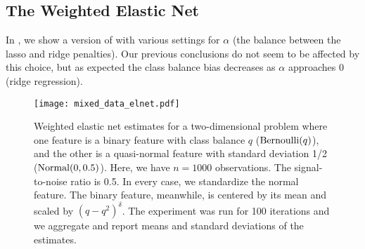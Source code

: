 \subsection{The Weighted Elastic Net}%
\label{sec:additional-experiments-weighted-elnet}

In , we show a version of  with
various settings for \(\alpha\) (the balance between the lasso and ridge penalties). Our
previous conclusions do not seem to be affected by this choice, but as expected the class
balance bias decreases as \(\alpha\) approaches 0 (ridge regression).

\begin{figure}[htpb]
  \centering
  \texttt{[image: mixed\_data\_elnet.pdf]}
  \caption{%
    Weighted elastic net estimates for a two-dimensional problem where one feature is a binary
    feature with class balance \(q\) (\(\operatorname{Bernoulli}(q)\)), and the other is a quasi-normal
    feature with standard deviation 1/2 (\(\operatorname{Normal}(0, 0.5)\)). Here, we have \(n = \num{1000}\)
    observations. The signal-to-noise ratio is 0.5. In every case, we standardize the normal
    feature. The binary feature, meanwhile, is centered by its mean and scaled by
    \((q-q^2)^\delta\). The experiment was run for 100 iterations and we aggregate and report
    means and standard deviations of the estimates.
  }
  \label{fig:mixed-data-elnet-full}
\end{figure}
